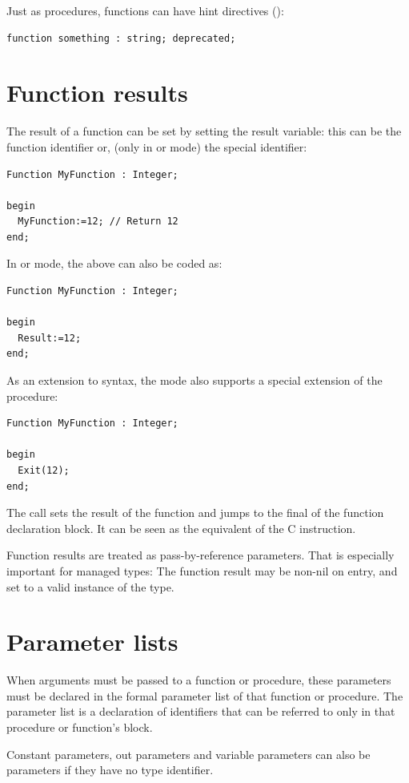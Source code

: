 Just as procedures, functions can have hint directives
():
\begin{verbatim}
function something : string; deprecated;
\end{verbatim}

\section{Function results}
The result of a function can be set by setting the result variable:
this can be the function identifier or, (only in  or  mode)
the special  identifier:
\begin{verbatim}
Function MyFunction : Integer;

begin
  MyFunction:=12; // Return 12
end;
\end{verbatim}
In  or  mode, the above can also be coded as:
\begin{verbatim}
Function MyFunction : Integer;

begin
  Result:=12;
end;
\end{verbatim}
As an extension to \delphi syntax, the  mode also supports a special
extension of the  procedure:
\begin{verbatim}
Function MyFunction : Integer;

begin
  Exit(12);
end;
\end{verbatim}
The  call sets the result of the function and jumps to the final
 of the function declaration block. It can be seen as the equivalent
of the C  instruction.

\begin{remark}
Function results are treated as pass-by-reference parameters.
That is especially important for managed types:
The function result may be non-nil on entry, and set to a valid instance of the type.
\end{remark}

\section{Parameter lists}
\label{se:Parameters}
When arguments must be passed to a function or procedure, these parameters
must be declared in the formal parameter list of that function or procedure.
The parameter list is a declaration of identifiers that can be referred to
only in that procedure or function's block.

Constant parameters, out parameters and variable parameters can also be 
parameters if they have no type
identifier.

